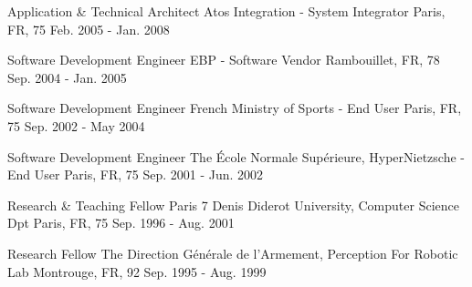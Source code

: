 \begin{cventries}
  \cventry
    {Application \& Technical Architect} %
    {Atos Integration - System Integrator} %
    {Paris, FR, 75} %
    {Feb. 2005 - Jan. 2008} %
    {
      \begin{cvitems} %
        \item {}
      \end{cvitems}
    }

  \cventry
    {Software Development Engineer} %
    {EBP - Software Vendor} %
    {Rambouillet, FR, 78} %
    {Sep. 2004 - Jan. 2005} %
    {
      \begin{cvitems} %
        \item {}
      \end{cvitems}
    }

  \cventry
    {Software Development Engineer} %
    {French Ministry of Sports - End User} %
    {Paris, FR, 75} %
    {Sep. 2002 - May 2004} %
    {
      \begin{cvitems} %
        \item {}
      \end{cvitems}
    }

  \cventry
    {Software Development Engineer} %
    {The \'Ecole Normale Supérieure, HyperNietzsche - End User} %
    {Paris, FR, 75} %
    {Sep. 2001 - Jun. 2002} %
    {
      \begin{cvitems} %
        \item {}
      \end{cvitems}
    }

  \cventry
    {Research \& Teaching Fellow} %
    {Paris 7 Denis Diderot University, Computer Science Dpt} %
    {Paris, FR, 75} %
    {Sep. 1996 - Aug. 2001} %
    {
      \begin{cvitems} %
        \item {}
      \end{cvitems}
    }

  \cventry
    {Research Fellow} %
    {The Direction Générale de l'Armement, Perception For Robotic Lab} %
    {Montrouge, FR, 92} %
    {Sep. 1995 - Aug. 1999} %
    {
      \begin{cvitems} %
        \item {}
      \end{cvitems}
    }

\end{cventries}
